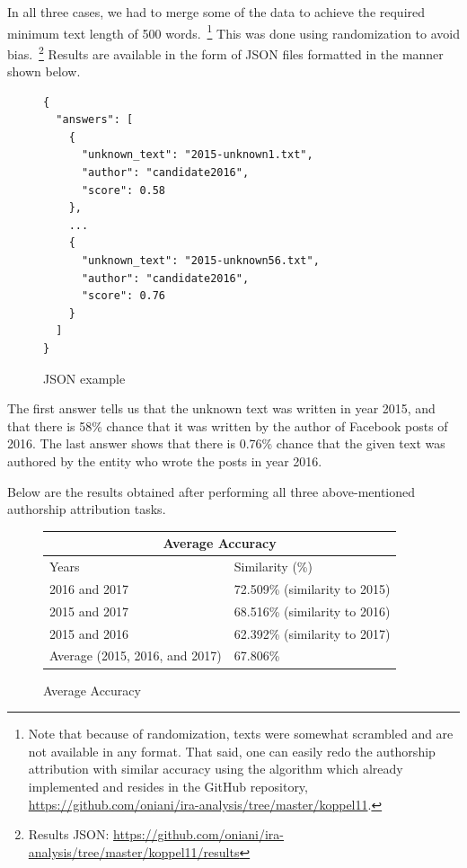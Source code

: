 \documentclass[12pt]{article}
\theoremstyle{definition}
\begin{document}
In all three cases, we had to merge some of the data to achieve the required
minimum text length of 500 words.~\footnote{Note that because of randomization,
texts were somewhat scrambled and are not available in any format. That said,
one can easily redo the authorship attribution with similar accuracy using
the algorithm which already implemented and resides in the GitHub repository,
\url{https://github.com/oniani/ira-analysis/tree/master/koppel11}.}
This was done using randomization to avoid bias.~\footnote{Results JSON:
\url{https://github.com/oniani/ira-analysis/tree/master/koppel11/results}}
Results are available in the form of JSON files formatted in the manner shown
below.

\begin{figure}[H]
\begin{verbatim}
{
  "answers": [
    {
      "unknown_text": "2015-unknown1.txt",
      "author": "candidate2016",
      "score": 0.58
    },
    ...
    {
      "unknown_text": "2015-unknown56.txt",
      "author": "candidate2016",
      "score": 0.76
    }
  ]
}
\end{verbatim}
\caption*{JSON example}
\end{figure}

The first answer tells us that the unknown text was written in year 2015, and
that there is 58\% chance that it was written by the author of Facebook posts
of 2016. The last answer shows that there is 0.76\% chance that the given
text was authored by the entity who wrote the posts in year 2016.

\bigskip

Below are the results obtained after performing all three above-mentioned
authorship attribution tasks.

\begin{figure}[H]
\centering
\begin{tabular}{|p{8cm}|p{8cm}|}
 \hline
 \multicolumn{2}{|c|}{Average Accuracy}\\
 \hline
 Years & Similarity (\%)\\
 \hline
 2016 and 2017 & 72.509\% (similarity to 2015)\\
 \hline
 2015 and 2017 & 68.516\% (similarity to 2016)\\
 \hline
 2015 and 2016 & 62.392\% (similarity to 2017)\\
 \hline
 Average (2015, 2016, and 2017) & 67.806\%\\
 \hline
\end{tabular}
\caption*{Average Accuracy}
\end{figure}
\end{document}
